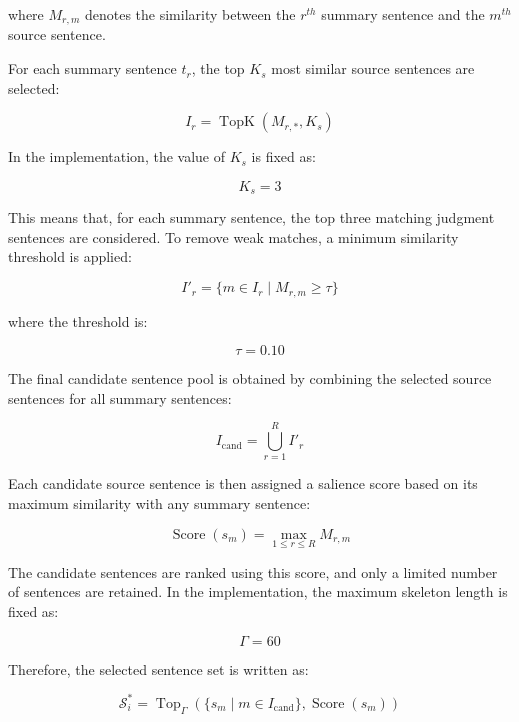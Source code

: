 where \(M_{r,m}\) denotes the similarity between the \(r^{th}\) summary sentence and the \(m^{th}\) source sentence.

For each summary sentence \(t_r\), the top \(K_s\) most similar source sentences are selected:

\begin{equation}
I_r=\operatorname{TopK}(M_{r,*},K_s)
\end{equation}

In the implementation, the value of \(K_s\) is fixed as:

\begin{equation}
K_s=3
\end{equation}

This means that, for each summary sentence, the top three matching judgment sentences are considered. To remove weak matches, a minimum similarity threshold is applied:

\begin{equation}
I'_r=\{m\in I_r \mid M_{r,m}\geq \tau\}
\end{equation}

where the threshold is:

\begin{equation}
\tau=0.10
\end{equation}

The final candidate sentence pool is obtained by combining the selected source sentences for all summary sentences:

\begin{equation}
I_{\text{cand}}=\bigcup_{r=1}^{R} I'_r
\end{equation}

Each candidate source sentence is then assigned a salience score based on its maximum similarity with any summary sentence:

\begin{equation}
\operatorname{Score}(s_m)=\max_{1\leq r\leq R} M_{r,m}
\end{equation}

The candidate sentences are ranked using this score, and only a limited number of sentences are retained. In the implementation, the maximum skeleton length is fixed as:

\begin{equation}
\Gamma=60
\end{equation}

Therefore, the selected sentence set is written as:

\begin{equation}
\mathcal{S}_i^{*}
=
\operatorname{Top}_{\Gamma}
\left(
\{s_m \mid m\in I_{\text{cand}}\},
\operatorname{Score}(s_m)
\right)
\end{equation}

